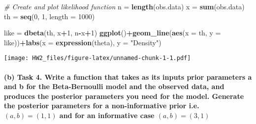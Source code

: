 \documentclass[]{article}
\newenvironment{Shaded}{\begin{snugshade}}{\end{snugshade}}
\newcommand{\KeywordTok}[1]{\textcolor[rgb]{0.13,0.29,0.53}{\textbf{#1}}}
\newcommand{\DataTypeTok}[1]{\textcolor[rgb]{0.13,0.29,0.53}{#1}}
\newcommand{\DecValTok}[1]{\textcolor[rgb]{0.00,0.00,0.81}{#1}}
\newcommand{\StringTok}[1]{\textcolor[rgb]{0.31,0.60,0.02}{#1}}
\newcommand{\CommentTok}[1]{\textcolor[rgb]{0.56,0.35,0.01}{\textit{#1}}}
\newcommand{\OperatorTok}[1]{\textcolor[rgb]{0.81,0.36,0.00}{\textbf{#1}}}
\newcommand{\NormalTok}[1]{#1}
\let\oldparagraph\paragraph
\renewcommand{\paragraph}[1]{\oldparagraph{#1}\mbox{}}
\begin{document}
\begin{Shaded}
\begin{Highlighting}[]
\CommentTok{# Create and plot likelihood function}
\NormalTok{n =}\StringTok{ }\KeywordTok{length}\NormalTok{(obs.data)}
\NormalTok{x =}\StringTok{ }\KeywordTok{sum}\NormalTok{(obs.data)}
\NormalTok{th =}\StringTok{ }\KeywordTok{seq}\NormalTok{(}\DecValTok{0}\NormalTok{, }\DecValTok{1}\NormalTok{, }\DataTypeTok{length =} \DecValTok{1000}\NormalTok{)}

\NormalTok{like =}\StringTok{ }\KeywordTok{dbeta}\NormalTok{(th, x}\OperatorTok{+}\DecValTok{1}\NormalTok{, n}\OperatorTok{-}\NormalTok{x}\OperatorTok{+}\DecValTok{1}\NormalTok{)}
\KeywordTok{ggplot}\NormalTok{()}\OperatorTok{+}\KeywordTok{geom_line}\NormalTok{(}\KeywordTok{aes}\NormalTok{(}\DataTypeTok{x =}\NormalTok{ th, }\DataTypeTok{y =}\NormalTok{ like))}\OperatorTok{+}\KeywordTok{labs}\NormalTok{(}\DataTypeTok{x =} \KeywordTok{expression}\NormalTok{(theta), }\DataTypeTok{y =} \StringTok{"Density"}\NormalTok{)}
\end{Highlighting}
\end{Shaded}

\texttt{[image: HW2\_files/figure-latex/unnamed-chunk-1-1.pdf]}

\paragraph{\texorpdfstring{(b) Task 4. Write a function that takes as
its inputs prior parameters a and b for the Beta-Bernoulli model and the
observed data, and produces the posterior parameters you need for the
model. Generate the posterior parameters for a non-informative prior
i.e. \((a,b) = (1,1)\) and for an informative case
\((a,b) = (3,1)\)}{(b) Task 4. Write a function that takes as its inputs prior parameters a and b for the Beta-Bernoulli model and the observed data, and produces the posterior parameters you need for the model. Generate the posterior parameters for a non-informative prior i.e. (a,b) = (1,1) and for an informative case (a,b) = (3,1)}}\label{b-task-4.-write-a-function-that-takes-as-its-inputs-prior-parameters-a-and-b-for-the-beta-bernoulli-model-and-the-observed-data-and-produces-the-posterior-parameters-you-need-for-the-model.-generate-the-posterior-parameters-for-a-non-informative-prior-i.e.-ab-11-and-for-an-informative-case-ab-31}
\end{document}
